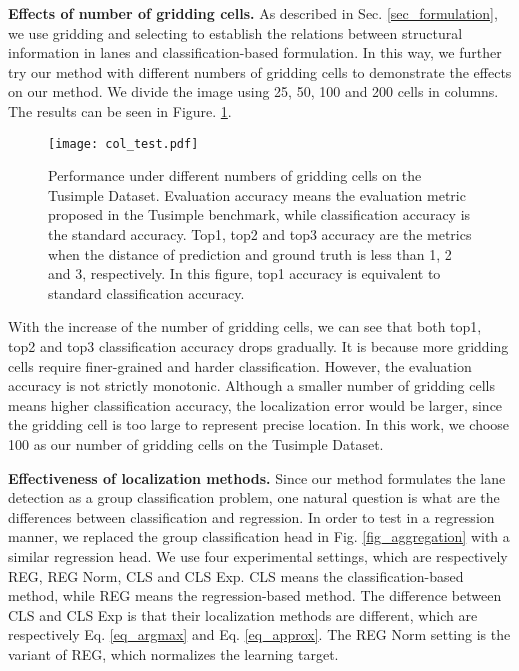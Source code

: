 \documentclass[runningheads]{llncs}
\begin{document}
\noindent
\textbf{Effects of number of gridding cells.}
\label{ab_griding}
As described in Sec. \ref{sec_formulation}, we use gridding and selecting to establish the relations between structural information in lanes and classification-based formulation. In this way, we further try our method with different numbers of gridding cells to demonstrate the effects on our method. We divide the image using 25, 50, 100 and 200 cells in columns. The results can be seen in Figure. \ref{fig_griding}. 
\begin{figure}[h]
	\centering
	\texttt{[image: col\_test.pdf]}
	\caption{Performance under different numbers of gridding cells on the Tusimple Dataset. Evaluation accuracy means the evaluation metric proposed in the Tusimple benchmark, while classification accuracy is the standard accuracy. Top1, top2 and top3 accuracy are the metrics when the distance of prediction and ground truth is less than 1, 2 and 3, respectively. In this figure, top1 accuracy is equivalent to standard classification accuracy.}
	\label{fig_griding}
	\vspace{-10pt}
\end{figure}

With the increase of the number of gridding cells, we can see that both top1, top2 and top3 classification accuracy drops gradually. It is because more gridding cells require finer-grained and harder classification. However, the evaluation accuracy is not strictly monotonic. Although a smaller number of gridding cells means higher classification accuracy, the localization error would be larger, since the gridding cell is too large to represent precise location. In this work, we choose 100 as our number of gridding cells on the Tusimple Dataset.



\noindent
\textbf{Effectiveness of localization methods.}
Since our method formulates the lane detection as a group classification problem, one natural question is what are the differences between classification and regression. In order to test in a regression manner, we replaced the group classification head in Fig. \ref{fig_aggregation} with a similar regression head. We use four experimental settings, which are respectively REG, REG Norm, CLS and CLS Exp. CLS means the classification-based method, while REG means the regression-based method. The difference between CLS and CLS Exp is that their localization methods are different, which are respectively Eq. \ref{eq_argmax} and Eq. \ref{eq_approx}. The REG Norm setting is the variant of REG, which normalizes the learning target.
\end{document}
